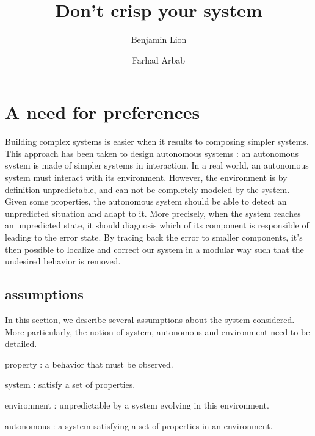 \title{Don't crisp your system}

\author{Benjamin Lion \and Farhad Arbab}



\section{A need for preferences}
Building complex systems is easier when it results to composing simpler systems. This approach has been taken to design autonomous systems : an autonomous system is made of simpler systems in interaction. In a real world, an autonomous system must interact with its environment. However, the environment is by definition unpredictable, and can not be completely modeled by the system. Given some properties, the autonomous system should be able to detect an unpredicted situation and adapt to it. More precisely, when the system reaches an unpredicted state, it should diagnosis which of its component is responsible of leading to the error state. By tracing back the error to smaller components, it's then possible to localize and correct our system in a modular way such that the undesired behavior is removed.

\subsection{assumptions}
In this section, we describe several assumptions about the system considered. More particularly, the notion of system, autonomous and environment need to be detailed.
\begin{list}{-}{ }
	\item property : a behavior that must be observed.
	\item system : satisfy a set of properties.
	\item environment : unpredictable by a system evolving in this environment.
	\item autonomous : a system satisfying a set of properties in an environment.
\end{list}

